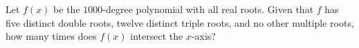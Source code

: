 Let $f(x)$ be the $1000$-degree polynomial with all real roots. Given that $f$ has five distinct double roots, twelve distinct triple roots, and no other multiple roots, how many times does $f(x)$ intersect the $x$-axis?
